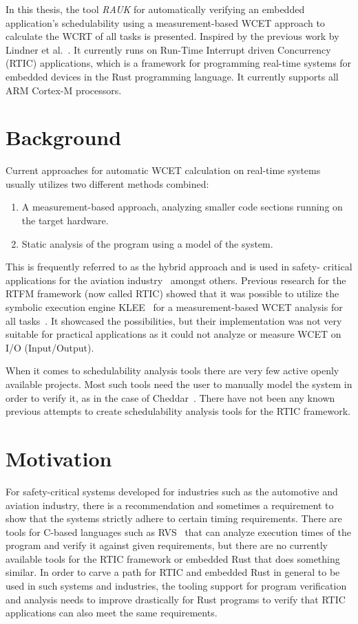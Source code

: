 In this thesis, the tool \emph{RAUK} for automatically verifying an embedded
application's schedulability using a measurement-based WCET approach to
calculate the WCRT of all tasks is presented. Inspired by the previous work by
Lindner et al.\ \cite{lindner}. It currently runs on Run-Time Interrupt driven
Concurrency (RTIC) applications, which is a framework for programming real-time
systems for embedded devices in the Rust programming language. It currently
supports all ARM Cortex-M processors.

\section{Background}
Current approaches for automatic WCET calculation on real-time systems usually
utilizes two different methods combined:
\begin{enumerate}
    \item A measurement-based approach, analyzing smaller code sections running
        on the target hardware.
    \item Static analysis of the program using a model of the system.
\end{enumerate}
This is frequently referred to as the hybrid approach and is used in safety-
critical applications for the aviation industry~\cite{rapita} amongst others.
Previous research for the RTFM framework (now called RTIC) showed that it was
possible to utilize the symbolic execution engine KLEE~\cite{kleepaper} for a
measurement-based WCET analysis for all tasks~\cite{lindner}. It showcased the
possibilities, but their implementation was not very suitable for practical
applications as it could not analyze or measure WCET on I/O (Input/Output).

When it comes to schedulability analysis tools there are very few active openly
available projects. Most such tools need the user to manually model the system
in order to verify it, as in the case of Cheddar~\cite{cheddar}. There have not
been any known previous attempts to create schedulability analysis tools for
the RTIC framework.

\section{Motivation}
For safety-critical systems developed for industries such as the automotive and
aviation industry, there is a recommendation and sometimes a requirement to
show that the systems strictly adhere to certain timing requirements. There
are tools for C-based languages such as RVS~\cite{rapita} that can analyze
execution times of the program and verify it against given requirements, but
there are no currently available tools for the RTIC framework or embedded Rust
that does something similar. In order to carve a path for RTIC and embedded
Rust in general to be used in such systems and industries, the tooling support
for program verification and analysis needs to improve drastically for Rust
programs to verify that RTIC applications can also meet the same requirements.

